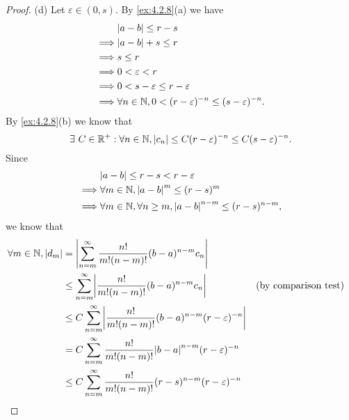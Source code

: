 \begin{proof}{(d)}
  Let \(\varepsilon \in (0, s)\).
  By \cref{ex:4.2.8}(a) we have
  \begin{align*}
             & \abs{a - b} \leq r - s                                                    \\
    \implies & \abs{a - b} + s \leq r                                                    \\
    \implies & s \leq r                                                                  \\
    \implies & 0 < \varepsilon < r                                                       \\
    \implies & 0 < s - \varepsilon \leq r - \varepsilon                                  \\
    \implies & \forall n \in \N, 0 < (r - \varepsilon)^{-n} \leq (s - \varepsilon)^{-n}.
  \end{align*}
  By \cref{ex:4.2.8}(b) we know that
  \[
    \exists\ C \in \mathbb{R}^+ : \forall n \in \mathbb{N}, \left\lvert c_n\right\rvert \leq C (r - \varepsilon)^{-n} \leq C (s - \varepsilon)^{-n}.
  \]
  Since
  \begin{align*}
             & \abs{a - b} \leq r - s < r - \varepsilon                                      \\
    \implies & \forall m \in \N, \abs{a - b}^{m} \leq (r - s)^m                              \\
    \implies & \forall m \in \N, \forall n \geq m, \abs{a - b}^{n - m} \leq (r - s)^{n - m},
  \end{align*}
  we know that
  \begin{align*}
    \forall m \in \N, \abs{d_m} & = \abs{\sum_{n = m}^\infty \dfrac{n!}{m! (n - m)!} (b - a)^{n - m} c_n}                                                          \\
                                & \leq \sum_{n = m}^\infty \abs{\dfrac{n!}{m! (n - m)!} (b - a)^{n - m} c_n}                      &  & \text{(by comparison test)} \\
                                & \leq C \sum_{n = m}^\infty \abs{\dfrac{n!}{m! (n - m)!} (b - a)^{n - m} (r - \varepsilon)^{-n}}                                  \\
                                & = C \sum_{n = m}^\infty \dfrac{n!}{m! (n - m)!} \abs{b - a}^{n - m} (r - \varepsilon)^{-n}                                       \\
                                & \leq C \sum_{n = m}^\infty \dfrac{n!}{m! (n - m)!} (r - s)^{n - m} (r - \varepsilon)^{-n}                                        \\

\end{align*}
\end{proof}
